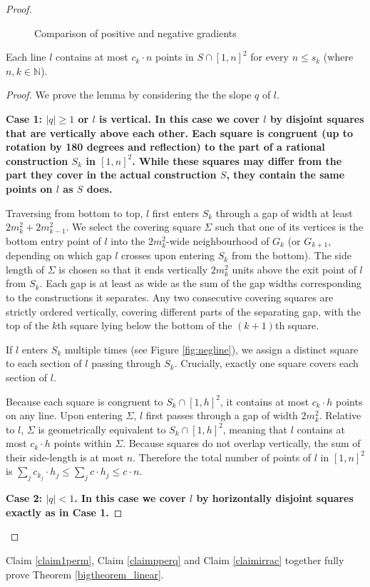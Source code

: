 \documentclass[11pt,a4paper]{article}
\numberwithin{equation}{section}
\newcommand{\nn}{\mathbb{N}}
\begin{document}
\begin{proof}
\begin{figure}[ht]
    \caption{Comparison of positive and negative gradients}
    \label{fig:comparison}
\end{figure}

\begin{lemma} \label{lemma3}
Each line $l$ contains at most $c_k\cdot n$ points in $S\cap [1,n]^2$ for every $n\le  s_k$ (where $n,k\in\nn$).


\end{lemma}
\begin{proof}
We prove the lemma by considering the the slope $q$ of $l$.


\noindent
\bf Case 1: \rm $|q|\ge 1$ or $l$ is vertical. In this case we cover $l$ by disjoint squares that are vertically above each other. Each square is congruent (up to rotation by 180 degrees and reflection) to the part of a rational construction $S_k$ in $[1,n]^2$. While these squares may differ from the part they cover in the actual construction $S$, they contain the same points on $l$ as $S$ does.

Traversing from bottom to top, $l$ first enters $S_k$ through a gap of width at least $2m_k^2+2m_{k-1}^2$. We select the covering square $\Sigma$ such that one of its vertices is the bottom entry point of $l$ into the $2m_k^2$-wide neighbourhood of $G_k$ (or $G_{k+1}$, depending on which gap $l$ crosses upon entering $S_k$ from the bottom). The side length of $\Sigma$ is chosen so that it ends vertically $2m_k^2$ units above the exit point of $l$ from $S_k$. Each gap is at least as wide as the sum of the gap widths corresponding to the constructions it separates. Any two consecutive covering squares are strictly ordered vertically, covering different parts of the separating gap, with the top of the $k$th square lying below the bottom of the $(k+1)$th square.

If $l$ enters $S_k$ multiple times (see Figure \ref{fig:negline}), we assign a distinct square to each section of $l$ passing through $S_k$. Crucially, exactly one square covers each section of $l$.

Because each square is congruent to $S_k\cap[1,h]^2$, it contains at most $c_k \cdot h$ points on any line. Upon entering $\Sigma$, $l$ first passes through a gap of width $2m_k^2$. Relative to $l$, $\Sigma$ is geometrically equivalent to $S_k\cap [1,h]^2$, meaning that $l$ contains at most $c_k \cdot h$ points within $\Sigma$. Because squares do not overlap vertically, the sum of their side-length is at most $n$. Therefore the total number of points of $l$ in $[1,n]^2$ is $\sum_j c_{k_j}\cdot h_j\le \sum_j c\cdot h_j\le c\cdot n$.


\noindent
\bf Case 2: \rm $|q|<1$. In this case we cover $l$ by horizontally disjoint squares exactly as in Case 1.
\end{proof}
\end{proof}
\noindent Claim \ref{claim1perm}, Claim \ref{claimpperq} and Claim \ref{claimirrac} together fully prove Theorem \ref{bigtheorem_linear}.
\end{document}
